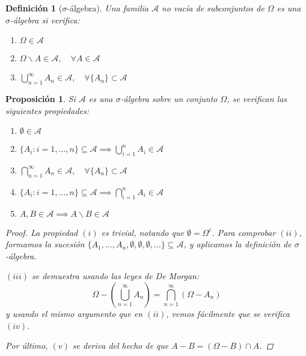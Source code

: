 \documentclass[11pt, a4paper]{article}
\theoremstyle{theorem-style}
\newtheorem{nprop}{Proposición}[section]
\theoremstyle{definition-style}
\newtheorem{ndef}{Definición}[section]
\theoremstyle{remark-style}
\theoremstyle{example-style}
\newenvironment{nlist}
{\begin{enumerate}
    \renewcommand\labelenumi{(\emph{\roman{enumi})}}}
  {\end{enumerate}}
\begin{document}
\begin{ndef}[$\sigma$-álgebra] Una familia $\mathcal A$ no vacía de subconjuntos de $\Omega$ es una \mbox{$\sigma$-álgebra} si verifica:

  \begin{nlist}
  \item $\Omega \in \mathcal A$
  \item $\displaystyle \Omega \backslash A \in \mathcal{A}, \quad \forall A \in \mathcal{A}$
  \item $\displaystyle \bigcup_{n=1}^\infty A_n \in \mathcal{A}, \quad \forall \{A_n\} \subset \mathcal{A}$
  \end{nlist}
  
\end{ndef}

\begin{nprop}
  Si $\mathcal A$ es una $\sigma$-álgebra sobre un conjunto $\Omega$, se verifican las siguientes propiedades: 
  
  \begin{nlist}
  \item $\emptyset \in \mathcal A$
  \item $\displaystyle \{A_i : i = 1,\dots,n\} \subseteq \mathcal{A} \implies \bigcup_{i=1}^n A_i \in \mathcal{A}$
  \item $\displaystyle \bigcap_{n=1}^\infty A_n \in \mathcal{A}, \quad \forall \{A_n\} \subset \mathcal{A}$
  \item $\displaystyle \{A_i : i = 1,\dots,n\} \subseteq \mathcal{A} \implies \bigcap_{i=1}^n A_i \in \mathcal{A}$
  \item $A,B \in \mathcal A \implies A \backslash B \in \mathcal A$
  \end{nlist}

  \begin{proof}
    La propiedad $(i)$ es trivial, notando que $\emptyset = \Omega^c$. Para comprobar $(ii)$, formamos la sucesión $\{A_1,\dots,A_n,\emptyset,\emptyset, \emptyset, \dots\} \subseteq \mathcal A$, y aplicamos la definición de $\sigma$-álgebra.
    
    $(iii)$ se demuestra usando las leyes de De Morgan: $$\Omega - \left( \bigcup_{n=1}^\infty A_n \right) = \bigcap_{n=1}^\infty (\Omega - A_n)$$ y usando el mismo argumento que en $(ii)$, vemos fácilmente que se verifica $(iv)$.
    
    Por último, $(v)$ se deriva del hecho de que $A - B = (\Omega - B) \cap A$.
  \end{proof}
\end{nprop}
\end{document}
